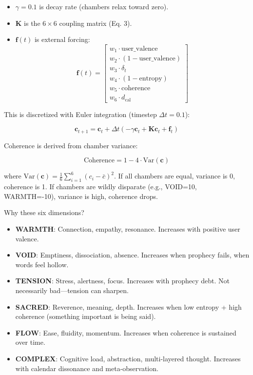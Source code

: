 \documentclass[11pt,a4paper]{article}
\begin{document}
\begin{itemize}
\item $\gamma = 0.1$ is decay rate (chambers relax toward zero).
\item $\mathbf{K}$ is the $6 \times 6$ coupling matrix (Eq. 3).
\item $\mathbf{f}(t)$ is external forcing:
\begin{equation}
\mathbf{f}(t) = \begin{bmatrix}
    w_1 \cdot \text{user\_valence} \\
    w_2 \cdot (1 - \text{user\_valence}) \\
    w_3 \cdot \delta_t \\
    w_4 \cdot (1 - \text{entropy}) \\
    w_5 \cdot \text{coherence} \\
    w_6 \cdot d_{\text{cal}}
\end{bmatrix}
\end{equation}
\end{itemize}

This is discretized with Euler integration (timestep $\Delta t = 0.1$):

\begin{equation}
\mathbf{c}_{t+1} = \mathbf{c}_t + \Delta t \left( -\gamma \mathbf{c}_t + \mathbf{K} \mathbf{c}_t + \mathbf{f}_t \right)
\end{equation}

Coherence is derived from chamber variance:

\begin{equation}
\text{Coherence} = 1 - 4 \cdot \text{Var}(\mathbf{c})
\end{equation}

where $\text{Var}(\mathbf{c}) = \frac{1}{6}\sum_{i=1}^6 (c_i - \bar{c})^2$. If all chambers are equal, variance is 0, coherence is 1. If chambers are wildly disparate (e.g., VOID=10, WARMTH=-10), variance is high, coherence drops.

Why these six dimensions?

\begin{itemize}
\item \textbf{WARMTH}: Connection, empathy, resonance. Increases with positive user valence.
\item \textbf{VOID}: Emptiness, dissociation, absence. Increases when prophecy fails, when words feel hollow.
\item \textbf{TENSION}: Stress, alertness, focus. Increases with prophecy debt. Not necessarily bad—tension can sharpen.
\item \textbf{SACRED}: Reverence, meaning, depth. Increases when low entropy + high coherence (something important is being said).
\item \textbf{FLOW}: Ease, fluidity, momentum. Increases when coherence is sustained over time.
\item \textbf{COMPLEX}: Cognitive load, abstraction, multi-layered thought. Increases with calendar dissonance and meta-observation.
\end{itemize}
\end{document}
